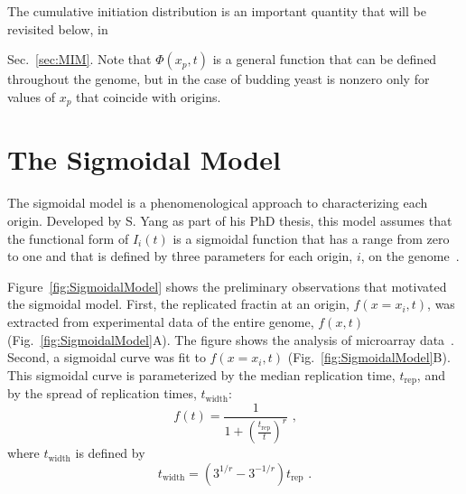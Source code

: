 		The cumulative initiation distribution is an important quantity that will be revisited below, in {Sec.~\ref{sec:MIM}.
		Note that $\Phi(x_p,t)$ is a general function that can be defined throughout the genome, but in the case of budding yeast is nonzero only for values of $x_p$ that coincide with origins.


	\section{The Sigmoidal Model}
	\label{sec:SigmoidalModel}
	
	The sigmoidal model is a phenomenological approach to characterizing each origin.
	Developed by S. Yang as part of his PhD thesis, this model assumes that the functional form of $I_i(t)$ is a sigmoidal function that has a range from zero to one and that is defined by three parameters for each origin, $i$, on the genome~\cite{ScottsPaper,ScottsThesis}.
	
	Figure~\ref{fig:SigmoidalModel} shows the preliminary observations that motivated the sigmoidal model.
	First, the replicated fractin at an origin, $f(x=x_i,t)$, was extracted from experimental data of the entire genome, $f(x,t)$ (Fig.~\ref{fig:SigmoidalModel}A).
	The figure shows the analysis of microarray data~\cite{McCuneMicroArray}.
	Second, a sigmoidal curve was fit to $f(x=x_i,t)$ (Fig.~\ref{fig:SigmoidalModel}B).
	This sigmoidal curve is parameterized by the median replication time, $t_{\text{rep}}$, and by the spread of replication times, $t_{\text{width}}$:
	\begin{equation} \label{eq:SigmoidalModel}
		f(t) = {\frac{1}{1+\left({\frac{t_{\text{rep}}}{t}}\right)^r}}\text{ ,}
	\end{equation}
	where $t_{\text{width}}$ is defined by
	\begin{equation} \label{eq:SigmoidalModel2}
		t_{\text{width}} = \left(3^{1/r}-3^{-1/r}\right)t_{\text{rep}}\text{ .}
	\end{equation}
	
}
